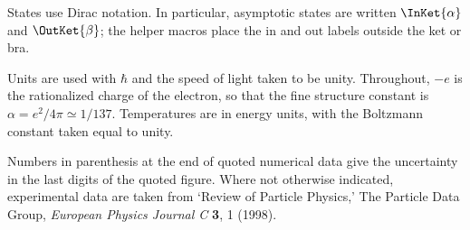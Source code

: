 States use Dirac notation. In particular, asymptotic states are written
\(\InKet{\alpha}\) and \(\OutKet{\beta}\); the helper macros place the
\(\mathrm{in}\) and \(\mathrm{out}\) labels outside the ket or bra.

Units are used with \(\hbar\) and the speed of light taken to be unity.
Throughout, \(-e\) is the rationalized charge of the electron, so that the
fine structure constant is \(\alpha=e^2/4\pi\simeq1/137\). Temperatures are in
energy units, with the Boltzmann constant taken equal to unity.

Numbers in parenthesis at the end of quoted numerical data give the
uncertainty in the last digits of the quoted figure. Where not otherwise
indicated, experimental data are taken from `Review of Particle Physics,' The
Particle Data Group, \emph{European Physics Journal C} \textbf{3}, 1 (1998).
